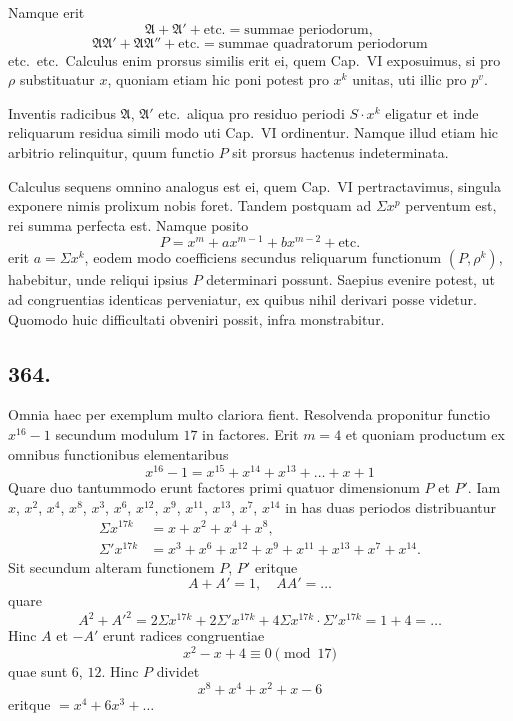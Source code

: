 \documentclass[12pt]{article}
\begin{document}
Namque erit
\[
\mathfrak{A}+\mathfrak{A}'+\text{etc.} = \text{summae periodorum},
\]
\[
\mathfrak{A}\mathfrak{A}'+\mathfrak{A}\mathfrak{A}''+\text{etc.} = \text{summae quadratorum periodorum}
\]
etc.~etc.~Calculus enim prorsus similis erit ei, quem Cap.~VI exposuimus, si pro $\rho$ substituatur $x$, quoniam etiam hic poni potest pro $x^k$ unitas, uti illic pro $p^v$.

Inventis radicibus $\mathfrak{A}$, $\mathfrak{A}'$ etc.~aliqua pro residuo periodi $S\cdot x^k$ eligatur et inde reliquarum residua simili modo uti Cap.~VI ordinentur. Namque illud etiam hic arbitrio relinquitur, quum functio $P$ sit prorsus hactenus indeterminata.

Calculus sequens omnino analogus est ei, quem Cap.~VI pertractavimus, singula exponere nimis prolixum nobis foret. Tandem postquam ad $\Sigma x^p$ perventum est, rei summa perfecta est. Namque posito
\[
P = x^m + ax^{m-1} + bx^{m-2} + \text{etc.}
\]
erit $a=\Sigma x^k$, eodem modo coefficiens secundus reliquarum functionum $(P,\rho^k)$, habebitur, unde reliqui ipsius $P$ determinari possunt. Saepius evenire potest, ut ad congruentias identicas perveniatur, ex quibus nihil derivari posse videtur. Quomodo huic difficultati obveniri possit, infra monstrabitur.

\subsection*{364.}

Omnia haec per exemplum multo clariora fient. Resolvenda proponitur functio $x^{16}-1$ secundum modulum $17$ in factores. Erit $m=4$ et quoniam productum ex omnibus functionibus elementaribus
\[
x^{16}-1 = x^{15}+x^{14}+x^{13}+\ldots+x+1
\]
Quare duo tantummodo erunt factores primi quatuor dimensionum $P$ et $P'$. Iam $x$, $x^2$, $x^4$, $x^8$, $x^3$, $x^6$, $x^{12}$, $x^9$, $x^{11}$, $x^{13}$, $x^7$, $x^{14}$ in has duas periodos distribuantur
\[
\begin{aligned}
\Sigma x^{17k} &= x+x^2+x^4+x^8,\\
\Sigma' x^{17k} &= x^3+x^6+x^{12}+x^9+x^{11}+x^{13}+x^7+x^{14}.
\end{aligned}
\]
Sit secundum alteram functionem $P$, $P'$ eritque
\[
A+A'=1,\quad AA'=\ldots
\]
quare
\[
A^2+A'^2 = 2\Sigma x^{17k} + 2\Sigma' x^{17k} + 4\Sigma x^{17k}\cdot\Sigma' x^{17k} = 1+4=\ldots
\]
Hinc $A$ et $-A'$ erunt radices congruentiae
\[
x^2 - x + 4 \equiv 0 \pmod{17}
\]
quae sunt $6$, $12$. Hinc $P$ dividet
\[
x^8+x^4+x^2+x-6
\]
eritque $=x^4+6x^3+\ldots$
\end{document}
